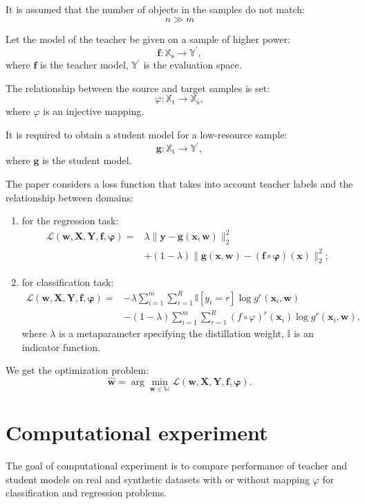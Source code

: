 \documentclass[12pt]{article}
\begin{document}
It is assumed that the number of objects in the samples do not match:
$$n \gg m$$

Let the model of the teacher be given on a sample of higher power:
$$\mathbf{f}: \mathbb{X}_{\text{s}} \rightarrow \mathbb{Y}^{\prime},$$
where $\mathbf{f}$ is the teacher model, $\mathbb{Y}^{\prime}$ is the evaluation space.

The relationship between the source and target samples is set:
$$\varphi: \mathbb{X}_{\text{t}} \rightarrow \mathbb{X}_{\text{s}},$$
where $\varphi$ is an injective mapping. 

It is required to obtain a student model for a low-resource sample:
$$\mathbf{g}: \mathbb{X}_{\text{t}} \rightarrow \mathbb{Y}^{\prime},$$
where $\mathbf{g}$ is the student model.

The paper considers a loss function that takes into account teacher labels and the relationship between domains:
\begin{enumerate}
     \item for the regression task:
     \[
     \begin{aligned}
     \mathcal{L}(\mathbf{w,X,Y,f,\varphi})=&\lambda\|\mathbf{y}-\mathbf{g}(\mathbf{x},\mathbf{w} )\|_{2}^{2}\\
     &+(1-\lambda)\|\mathbf{g}(\mathbf{x},\mathbf{w})-(\mathbf{f}\circ \mathbf{\varphi})(\mathbf{x} )\|_{2}^{2};
     \end{aligned}
     \]
     \item for classification task:
     \[
     \begin{aligned}
     \mathcal{L}(\mathbf{w,X,Y,f,\varphi})=&-\lambda\sum\limits_{i=1}^{m}\sum\limits_{r=1}^{ R}\mathbb{I}[y_{i}=r]\log{g^{r}(\mathbf{x}_{i},\mathbf{w})}\\
     &-(1-\lambda)\sum\limits_{i=1}^{m}\sum\limits_{r=1}^{R}(f\circ \varphi)^{r}(\mathbf{x }_{i})\log{g^{r}(\mathbf{x}_{i},\mathbf{w})},
     \end{aligned}
     \]
     where $\lambda$ is a metaparameter specifying the distillation weight, $\mathbb{I}$ is an indicator function.
\end{enumerate}

We get the optimization problem:
$$\hat{\mathbf{w}} = \arg\min_{\mathbf{w} \in \mathbb{W}} \mathcal{L}(\mathbf{w,X,Y,f,\varphi} ).$$

\section{Computational experiment}
The goal of computational experiment is to compare performance of teacher and student models on real and synthetic datasets with or without mapping $\varphi$ for classification and regression problems.
\end{document}
